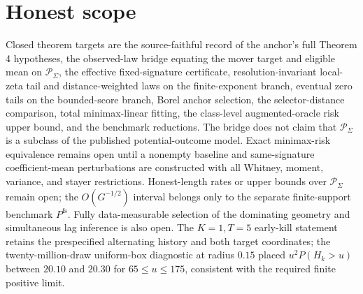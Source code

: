 \documentclass{article}
\begin{document}
\section{Honest scope}

Closed theorem targets are the source-faithful record of the anchor's full Theorem 4 hypotheses, the observed-law bridge equating the mover target and eligible mean on \(\mathcal P_\Sigma\), the effective fixed-signature certificate, resolution-invariant local-zeta tail and distance-weighted laws on the finite-exponent branch, eventual zero tails on the bounded-score branch, Borel anchor selection, the selector-distance comparison, total minimax-linear fitting, the class-level augmented-oracle risk upper bound, and the benchmark reductions. The bridge does not claim that \(\mathcal P_\Sigma\) is a subclass of the published potential-outcome model. Exact minimax-risk equivalence remains open until a nonempty baseline and same-signature coefficient-mean perturbations are constructed with all Whitney, moment, variance, and stayer restrictions. Honest-length rates or upper bounds over \(\mathcal P_\Sigma\) remain open; the \(O(G^{-1/2})\) interval belongs only to the separate finite-support benchmark \(P^{\mathrm{fs}}\). Fully data-measurable selection of the dominating geometry and simultaneous lag inference is also open. The \(K=1,T=5\) early-kill statement retains the prespecified alternating history and both target coordinates; the twenty-million-draw uniform-box diagnostic at radius \(0.15\) placed \(u^2P(H_k>u)\) between \(20.10\) and \(20.30\) for \(65\le u\le175\), consistent with the required finite positive limit.
\end{document}

